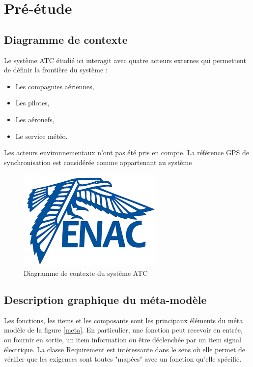 \section{Pré-étude}


\subsection{ Diagramme de contexte }

Le système ATC étudié ici interagit avec quatre acteurs externes qui permettent de définir la frontière du système : 

\begin{itemize}
	\item Les compagnies aériennes,
	\item Les pilotes,
	\item Les aéronefs,
	\item Le service météo. 
\end{itemize}

Les acteurs environnementaux n'ont pas été pris en compte. La référence GPS de synchronisation est considérée comme appartenant au système

	\begin{figure}[H]
	\begin{center}	
		\includegraphics[scale=1.0]{images/enac}
		\caption{Diagramme de contexte du système ATC}
		\label{ctx}
	\end{center}
\end{figure}

\subsection{ Description graphique du méta-modèle }

Les fonctions, les items et les composants sont les principaux éléments du méta modèle de la  figure \ref{meta}. En particulier, une fonction peut recevoir en entrée, ou fournir en sortie, un item information ou être déclenchée par un item signal électrique. La classe Requirement est intéressante dans le sens où elle permet de vérifier que les exigences sont toutes "mapées" avec un fonction qu'elle spécifie. 

